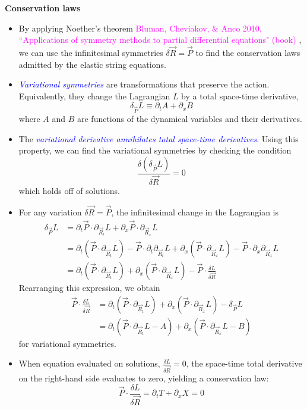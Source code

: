 \documentclass[landscape]{slides}
\def\myref#1{\textcolor{magenta}{\small #1}}
\def\myemph#1{\textcolor{blue}{\em #1}}
\begin{document}
\newpage

\begin{center}
\textbf{Conservation laws}
\end{center}

\begin{itemize}
\item 
By applying Noether's theorem 
\myref{Bluman, Cheviakov, \&  Anco 2010, ``Applications of symmetry methods to partial differential equations" (book) },
we can use the infinitesimal symmetries $\delta \vec{R} = \vec{P}$ 
to find the conservation laws admitted by the elastic string equations. 
\item
\myemph{Variational symmetries} are transformations that preserve the action.
Equivalently, they change the Lagrangian $L$ by a total space-time derivative, 
\[\label{variational_symmetry_condition1}
\delta_{\vec{P}} L \equiv \partial_t A + \partial_x B
\]
where $A$ and $B$ are functions of the dynamical variables and their derivatives.
\item
The \myemph{variational derivative annihilates total space-time derivatives}. 
Using this property, 
we can find the variational symmetries 
by checking the condition 
\[
\frac{\delta (\delta_{\vec{P}} L) }{\delta \vec{R}} = 0
\]
which holds off of solutions. 
\newpage
\item
For any variation $\delta \vec{R} = \vec{P}$, the infinitesimal change in the Lagrangian is 
\[\label{L_variation} \begin{aligned}
\delta_{\vec{P}} L 
&= 
\partial_t \vec{P} \cdot \partial_{\vec{R}_t} L
+ \partial_x \vec{P} \cdot \partial_{\vec{R}_x} L 
\\
&= 
\partial_t (\vec{P} \cdot \partial_{\vec{R}_t} L)
- \vec{P} \cdot \partial_t \partial_{\vec{R}_t} L
+ \partial_x (\vec{P} \cdot \partial_{\vec{R}_x} L)
- \vec{P} \cdot \partial_x \partial_{\vec{R}_x} L 
\\
&= 
\partial_t (\vec{P} \cdot \partial_{\vec{R}_t} L)
+ \partial_x (\vec{P} \cdot \partial_{\vec{R}_x} L)
- \vec{P} \cdot \frac{\delta L}{\delta \vec{R}}  
\end{aligned}\]
Rearranging this expression, we obtain
\[\label{variational_symmetry_condition2}\begin{aligned}
\vec{P} \cdot \frac{\delta L}{\delta \vec{R}}
&=
\partial_t (\vec{P} \cdot \partial_{\vec{R}_t} L)
+ \partial_x (\vec{P} \cdot \partial_{\vec{R}_x} L)
- \delta_{\vec{P}} L 
\\
&=
\partial_t (\vec{P} \cdot \partial_{\vec{R}_t} L - A)
+ \partial_x (\vec{P} \cdot \partial_{\vec{R}_x} L - B)
\end{aligned}\]
for variational symmetries.
\item
When equation evaluated on solutions, $\frac{\delta L}{\delta \vec{R}} = 0$,  
the space-time total derivative on the right-hand side evaluates to zero, yielding a conservation law:
\[
\vec{P} \cdot \frac{\delta L}{\delta \vec{R}} = \partial_t T + \partial_x X = 0
\] 


\end{itemize}
\end{document}
